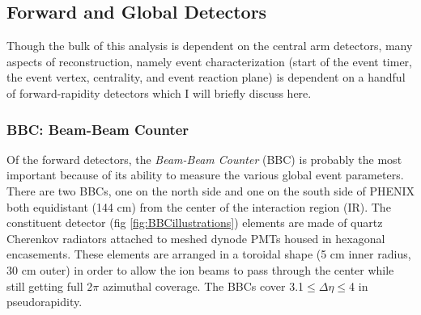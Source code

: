 \subsection{Forward and Global Detectors}
Though the bulk of this analysis is dependent on the central arm detectors, many aspects of reconstruction, namely event characterization (start of the event timer, the event vertex, centrality, and event reaction plane) is dependent on a handful of forward-rapidity detectors which I will briefly discuss here.

\subsubsection{BBC: Beam-Beam Counter}
Of the forward detectors, the \textit{Beam-Beam Counter} (BBC) \citep{BBCfocus} is probably the most important because of its ability to measure the various global event parameters. There are two BBCs, one on the north side and one on the south side of PHENIX both equidistant (144 cm) from the center of the interaction region (IR). The constituent detector (fig \ref{fig:BBCillustrations}) elements are made of quartz Cherenkov radiators attached to meshed dynode PMTs housed in hexagonal encasements. These elements are arranged in a toroidal shape (5 cm inner radius, 30 cm outer) in order to allow the ion beams to pass through the center while still getting full $2\pi$ azimuthal coverage. The BBCs cover 3.1$\leq \Delta \eta \leq$4 in pseudorapidity. 
